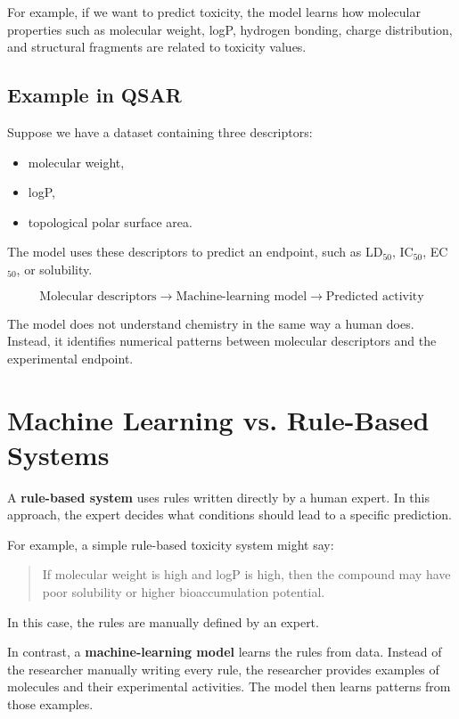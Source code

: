 \documentclass[11pt]{report}
\newenvironment{Important note}{\begin{quote}\color{red}\textbf{Important note:} }{\end{quote}}
\begin{document}
For example, if we want to predict toxicity, the model learns how molecular properties such as molecular weight, logP, hydrogen bonding, charge distribution, and structural fragments are related to toxicity values.

\subsection*{Example in QSAR}

Suppose we have a dataset containing three descriptors:

\begin{itemize}[leftmargin=*]
    \item molecular weight,
    \item logP,
    \item topological polar surface area.
\end{itemize}

The model uses these descriptors to predict an endpoint, such as LD$_{50}$, IC$_{50}$, EC$_{50}$, or solubility.

\[
\text{Molecular descriptors} \rightarrow \text{Machine-learning model} \rightarrow \text{Predicted activity}
\]

The model does not understand chemistry in the same way a human does. Instead, it identifies numerical patterns between molecular descriptors and the experimental endpoint.

\section{Machine Learning vs. Rule-Based Systems}

A \textbf{rule-based system} uses rules written directly by a human expert. In this approach, the expert decides what conditions should lead to a specific prediction.

For example, a simple rule-based toxicity system might say:

\begin{quote}
If molecular weight is high and logP is high, then the compound may have poor solubility or higher bioaccumulation potential.
\end{quote}

In this case, the rules are manually defined by an expert.

In contrast, a \textbf{machine-learning model} learns the rules from data. Instead of the researcher manually writing every rule, the researcher provides examples of molecules and their experimental activities. The model then learns patterns from those examples.
\end{document}
